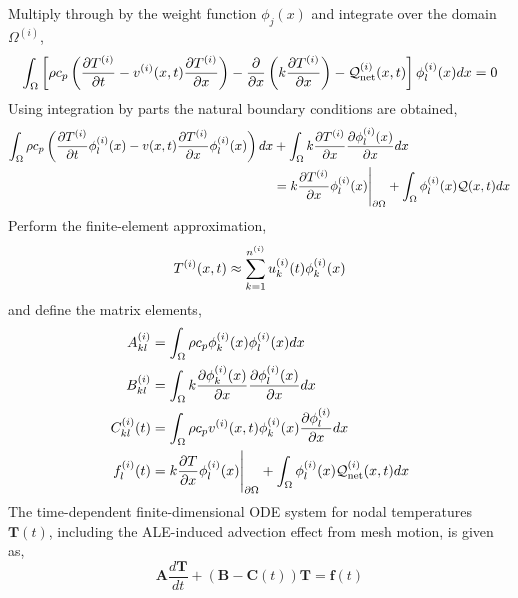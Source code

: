 Multiply through by the weight function $\phi_j(x)$ and integrate over the domain $\Omega^{(i)}$,
\begin{equation}
    \int_{\Omega}\left[\rho c_p\left(\frac{\partial T^{(i)}}{\partial t} - v^{(i)}(x,t)\frac{\partial T^{(i)}}{\partial x}\right) - \frac{\partial}{\partial x}\left(k\frac{\partial T^{(i)}}{\partial x}\right) - \mathcal{Q}^{(i)}_{\text{net}}(x,t)\right]\phi^{(i)}_l(x)dx = 0
\end{equation}
Using integration by parts the natural boundary conditions are obtained,
\begin{align}
    \int_{\Omega}\rho c_p\left(\frac{\partial T^{(i)}}{\partial t}\phi^{(i)}_l(x) - v(x,t)\frac{\partial T^{(i)}}{\partial x}\phi^{(i)}_l(x)\right)dx &+ \int_{\Omega} k\frac{\partial T^{(i)}}{\partial x}\frac{\partial\phi^{(i)}_l(x)}{\partial x} dx\notag\\
    &=k\frac{\partial T^{(i)}}{\partial x}\phi^{(i)}_l(x)\Bigg|_{\partial\Omega} + \int_{\Omega}\phi^{(i)}_l(x)\mathcal{Q}(x,t)dx
\end{align}
Perform the finite-element approximation,
\begin{equation}
    T^{(i)}(x,t)\approx\sum_{k=1}^{n^{(i)}}u^{(i)}_k(t)\phi^{(i)}_k(x)
\end{equation}
and define the matrix elements,
\begin{align}
    A^{(i)}_{kl} &= \int_{\Omega}\rho c_p\phi^{(i)}_k(x)\phi^{(i)}_l(x)dx\\
    B^{(i)}_{kl} &= \int_{\Omega}k\frac{\partial\phi^{(i)}_k(x)}{\partial x}\frac{\partial\phi^{(i)}_l(x)}{\partial x}dx\\
    C^{(i)}_{kl}(t) &= \int_{\Omega}\rho c_p v^{(i)}(x,t)\phi^{(i)}_k(x)\frac{\partial\phi^{(i)}_l}{\partial x}dx\\
    f^{(i)}_l(t) &= k\frac{\partial T}{\partial x}\phi^{(i)}_l(x)\Bigg|_{\partial\Omega} + \int_{\Omega}\phi^{(i)}_l(x)\mathcal{Q}_{\text{net}}^{(i)}(x,t)dx
\end{align}
The time-dependent finite-dimensional ODE system for nodal temperatures $\mathbf{T}(t)$, including the ALE-induced advection effect from mesh motion, is given as,
\begin{equation}
    \mathbf{A}\frac{d\mathbf{T}}{dt} + \left(\mathbf{B} - \mathbf{C}(t)\right)\mathbf{T} = \mathbf{f}(t)
\end{equation}

